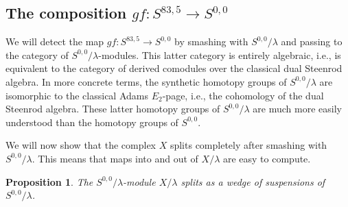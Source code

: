 \documentclass{amsart}
\newtheorem{prop}[thm]{Proposition}
\theoremstyle{definition}
\newcommand{\map}{\rightarrow}
\begin{document}
\subsection{The composition $g f: S^{83,5} \map S^{0,0}$}
\label{subsctn:composition}

We will detect the map $g f: S^{83,5} \map S^{0,0}$ by smashing with $S^{0,0}/\lambda$ and passing
to the category of $S^{0,0}/\lambda$-modules.  This latter category is
entirely algebraic, i.e., is equivalent to the category of
derived comodules over the classical dual Steenrod algebra.  
In more concrete
terms, the synthetic homotopy groups of $S^{0,0}/\lambda$ are isomorphic
to the classical Adams $E_2$-page, i.e., the cohomology of the dual Steenrod algebra.  These latter homotopy groups of $S^{0,0}/\lambda$
are much more easily understood than the homotopy 
groups of $S^{0,0}$.

We will now show that the complex $X$ splits completely 
after smashing with $S^{0,0}/\lambda$.  This means that maps into and out of
$X/\lambda$ are easy to compute.

\begin{prop}
\label{prop:split/L}
The $S^{0,0}/\lambda$-module $X/\lambda$
splits as a wedge
of suspensions of $S^{0,0}/\lambda$.
\end{prop}
\end{document}
